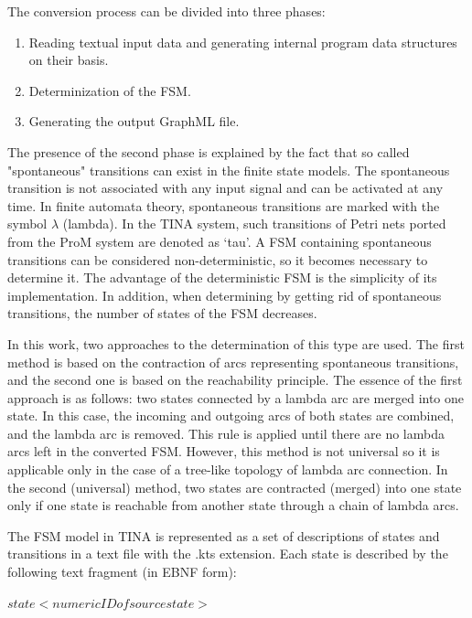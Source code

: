 \begin{bibunit}
The conversion process can be divided into three phases:

\begin{enumerate}

\item Reading textual input data and generating internal program data structures on their basis. 
\item  Determinization of the FSM.
\item  Generating the output GraphML file.

\end{enumerate}


The presence of the second phase is explained by the fact that so called "spontaneous" transitions can exist in the finite state models. The spontaneous transition is not associated with any input signal and can be activated at any time. In finite automata theory, spontaneous transitions are marked with the symbol $\lambda$ (lambda). In the TINA system, such transitions of Petri nets ported from the ProM system \cite{ProM} are denoted as ‘tau’. A FSM containing spontaneous transitions can be considered non-deterministic, so it becomes necessary to determine it. The advantage of the deterministic FSM is the simplicity of its implementation. In addition, when determining by getting rid of spontaneous transitions, the number of states of the FSM decreases.

In this work, two approaches to the determination of this type are used. The first method is based on the contraction of arcs representing spontaneous transitions, and the second one is based on the reachability principle. The essence of the first approach is as follows: two states connected by a lambda arc are merged into one state. In this case, the incoming and outgoing arcs of both states are combined, and the lambda arc is removed. This rule is applied until there are no lambda arcs left in the converted FSM. However, this method is not universal so it is applicable only in the case of a tree-like topology of lambda arc connection. In the second (universal) method, two states are contracted (merged) into one state only if one state is reachable from another state through a chain of lambda arcs.

The FSM model in TINA is represented as a set of descriptions of states and transitions in a text file with the .kts extension. Each state is described by the following text fragment (in EBNF form):

    
$state <numeric ID of source state>$


\end{bibunit}
